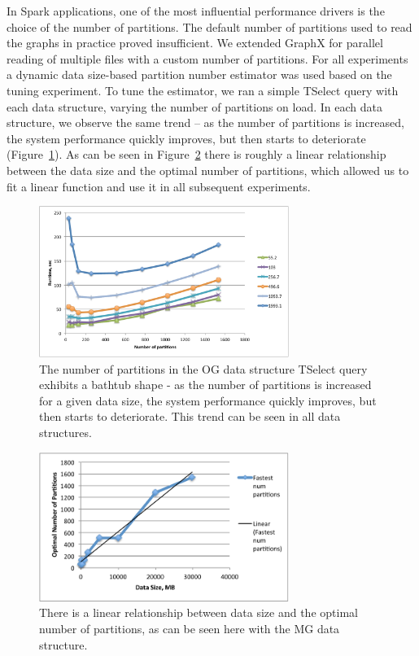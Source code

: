 In Spark applications, one of the most influential performance drivers
is the choice of the number of partitions.  The default number of
partitions used to read the graphs in practice proved insufficient.
We extended GraphX for parallel reading of multiple files with a
custom number of partitions.  For all experiments a dynamic data
size-based partition number estimator was used based on the tuning
experiment.  To tune the estimator, we ran a simple TSelect query with
each data structure, varying the number of partitions on load.  In
each data structure, we observe the same trend -- as the number of
partitions is increased, the system performance quickly improves, but
then starts to deteriorate (Figure~\ref{fig:numparts}).  As can be
seen in Figure~\ref{fig:partsfit} there is roughly a linear
relationship between the data size and the optimal number of
partitions, which allowed us to fit a linear function and use it in
all subsequent experiments.

\begin{figure}[t!]
\includegraphics[width=3.2in]{figs/numparts.pdf}
\caption{The number of partitions in the OG data structure TSelect
  query exhibits a bathtub shape - as the number of partitions is
  increased for a given data size, the system performance quickly
  improves, but then starts to deteriorate.  This trend can be seen in
  all data structures.}
\label{fig:numparts}
\end{figure}

\begin{figure}[t!]
\includegraphics[width=3.2in]{figs/partsfit.pdf}
\caption{There is a linear relationship between data size and the
  optimal number of partitions, as can be seen here with the MG data
  structure.}
\label{fig:partsfit}
\end{figure}

